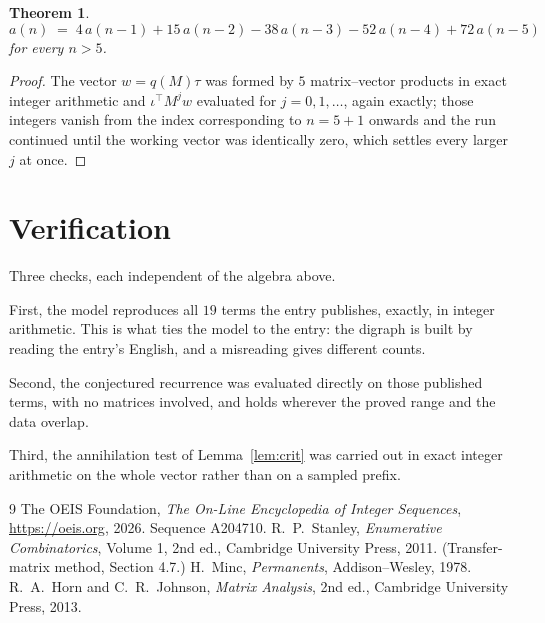 \documentclass[11pt,a4paper]{article}
\theoremstyle{plain}
\newtheorem{theorem}{Theorem}
\theoremstyle{definition}
\begin{document}
\begin{theorem}
\[
a(n)\;=\;4\,a(n-1) + 15\,a(n-2) - 38\,a(n-3) - 52\,a(n-4) + 72\,a(n-5)
\]
for every $n>5$.
\end{theorem}

\begin{proof}
The vector $w=q(M)\tau$ was formed by $5$ matrix--vector products in exact integer
arithmetic and $\iota^{\!\top}M^{j}w$ evaluated for $j=0,1,\dots$, again exactly; those
integers vanish from the index corresponding to $n=5+1$ onwards and the run continued
until the working vector was identically zero, which settles every larger $j$ at once.
\end{proof}

\section{Verification}

Three checks, each independent of the algebra above.

First, the model reproduces all $19$ terms the entry publishes, exactly, in integer
arithmetic. This is what ties the model to the entry: the digraph is built by reading the
entry's English, and a misreading gives different counts.

Second, the conjectured recurrence was evaluated directly on those published terms, with no
matrices involved, and holds wherever the proved range and the data overlap.

Third, the annihilation test of Lemma~\ref{lem:crit} was carried out in exact integer
arithmetic on the whole vector rather than on a sampled prefix.

\begin{thebibliography}{9}
 The OEIS Foundation, \emph{The On-Line Encyclopedia of Integer
Sequences}, \url{https://oeis.org}, 2026. Sequence A204710.
 R.~P.~Stanley, \emph{Enumerative Combinatorics}, Volume 1, 2nd ed.,
Cambridge University Press, 2011. (Transfer-matrix method, Section 4.7.)
 H.~Minc, \emph{Permanents}, Addison--Wesley, 1978.
 R.~A.~Horn and C.~R.~Johnson, \emph{Matrix Analysis}, 2nd ed., Cambridge
University Press, 2013.
\end{thebibliography}
\end{document}
